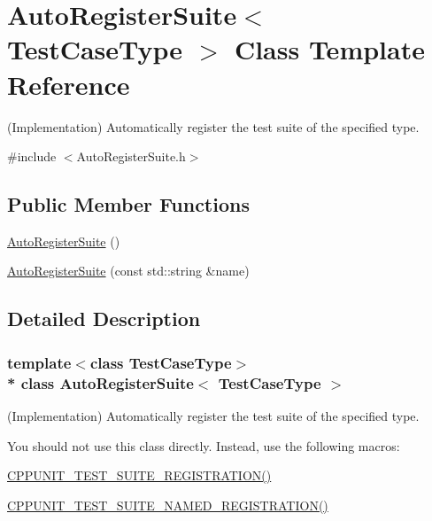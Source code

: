 \hypertarget{class_auto_register_suite}{}\section{Auto\+Register\+Suite$<$ Test\+Case\+Type $>$ Class Template Reference}
\label{class_auto_register_suite}


(Implementation) Automatically register the test suite of the specified type.  




{\ttfamily \#include $<$Auto\+Register\+Suite.\+h$>$}

\subsection*{Public Member Functions}
\begin{DoxyCompactItemize}
\item 
\hyperlink{class_auto_register_suite_a4c02d0d6e3de726f67b875dc5615e22a}{Auto\+Register\+Suite} ()
\item 
\hyperlink{class_auto_register_suite_a9350fa1995545aad03b61b7a6db690e4}{Auto\+Register\+Suite} (const std\+::string \&name)
\end{DoxyCompactItemize}


\subsection{Detailed Description}
\subsubsection*{template$<$class Test\+Case\+Type$>$\\*
class Auto\+Register\+Suite$<$ Test\+Case\+Type $>$}

(Implementation) Automatically register the test suite of the specified type. 

You should not use this class directly. Instead, use the following macros\+:
\begin{DoxyItemize}
\item \hyperlink{_helper_macros_8h_a70f00cc9f589d24019ee9efee4de2d74}{C\+P\+P\+U\+N\+I\+T\+\_\+\+T\+E\+S\+T\+\_\+\+S\+U\+I\+T\+E\+\_\+\+R\+E\+G\+I\+S\+T\+R\+A\+T\+I\+O\+N()}
\item \hyperlink{_helper_macros_8h_a028a5855a40ad3836e2a26aa48cd4c91}{C\+P\+P\+U\+N\+I\+T\+\_\+\+T\+E\+S\+T\+\_\+\+S\+U\+I\+T\+E\+\_\+\+N\+A\+M\+E\+D\+\_\+\+R\+E\+G\+I\+S\+T\+R\+A\+T\+I\+O\+N()}
\end{DoxyItemize}

